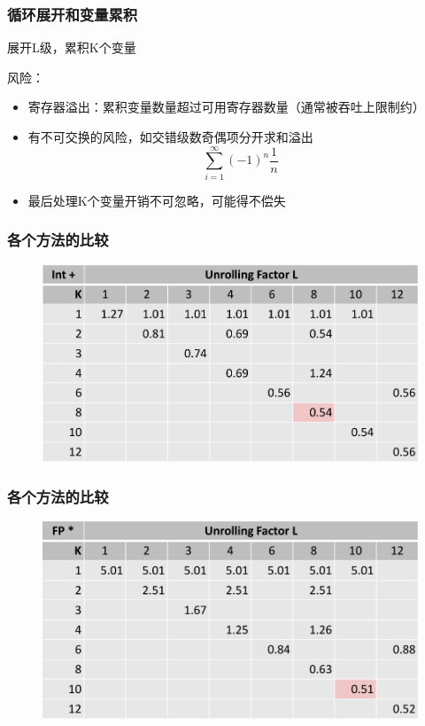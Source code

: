 \documentclass[12pt,AutoFakeBold,aspectratio=43,mathserif]{beamer}
\begin{document}
{\begin{frame}
    \end{frame}

    \begin{frame}
        \frametitle{循环展开和变量累积}
    
        展开L级，累积K个变量

        风险：
        \begin{itemize}
            \item 寄存器溢出：累积变量数量超过可用寄存器数量（通常被吞吐上限制约）
            \item 有不可交换的风险，如交错级数奇偶项分开求和溢出\[\sum_{i=1}^\infty(-1)^n\frac{1}{n}\]
            \item 最后处理K个变量开销不可忽略，可能得不偿失
        \end{itemize}
    
    \end{frame}

    \begin{frame}
        \frametitle{各个方法的比较}
    
        \begin{figure}
            \includegraphics[width=\textwidth]{figures/add.png}
        \end{figure}
    
    \end{frame}

    \begin{frame}
        \frametitle{各个方法的比较}
    
        \begin{figure}
            \includegraphics[width=\textwidth]{figures/multi.png}
        \end{figure}
    

\end{frame}}
\end{document}
